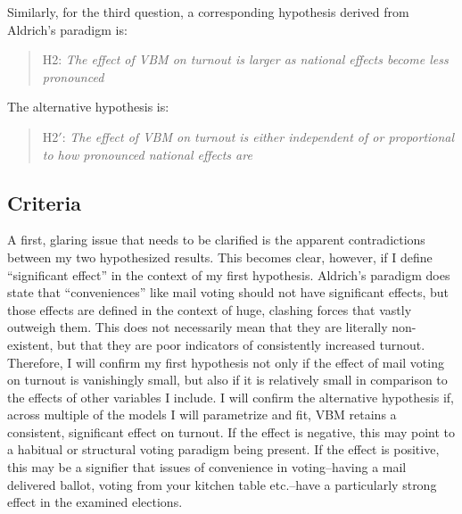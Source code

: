 \documentclass[12pt,twoside]{reedthesis}
\begin{document}
  Similarly, for the third question, a corresponding hypothesis derived
  from Aldrich's paradigm is:
  
  \begin{quotation}  
  H2: \textit{The  effect  of  VBM  on  turnout  is  larger  as  national  effects  become less pronounced}
  \end{quotation}
  
  The alternative hypothesis is:
  
  \begin{quotation}  
  H2$'$: \textit{The  effect  of  VBM  on  turnout  is either independent of or proportional to how pronounced national effects are}
  \end{quotation}
  
  \subsection{Criteria}\label{criteria}
  
  A first, glaring issue that needs to be clarified is the apparent
  contradictions between my two hypothesized results. This becomes clear,
  however, if I define ``significant effect'' in the context of my first
  hypothesis. Aldrich's paradigm does state that ``conveniences'' like
  mail voting should not have significant effects, but those effects are
  defined in the context of huge, clashing forces that vastly outweigh
  them. This does not necessarily mean that they are literally
  non-existent, but that they are poor indicators of consistently
  increased turnout. Therefore, I will confirm my first hypothesis not
  only if the effect of mail voting on turnout is vanishingly small, but
  also if it is relatively small in comparison to the effects of other
  variables I include. I will confirm the alternative hypothesis if,
  across multiple of the models I will parametrize and fit, VBM retains a
  consistent, significant effect on turnout. If the effect is negative,
  this may point to a habitual or structural voting paradigm being
  present. If the effect is positive, this may be a signifier that issues
  of convenience in voting--having a mail delivered ballot, voting from
  your kitchen table etc.--have a particularly strong effect in the
  examined elections.
  
\end{document}
